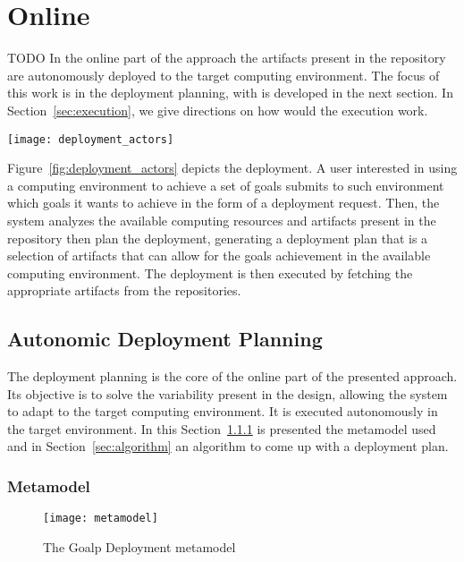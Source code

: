 \section{Online}
\label{sec:online}

TODO
In the online part of the approach the artifacts present in the repository are autonomously deployed to the target computing environment. The focus of this work is in the deployment planning, with is developed in the next section. In Section~\ref{sec:execution}, we give directions on how would the execution work.

\begin{figure*}[!htb]
  \centering
  \texttt{[image: deployment\_actors]}
  \caption{Goald Autonomic Deployment}
\label{fig:deployment_actors}
\end{figure*}

Figure~\ref{fig:deployment_actors} depicts the deployment. A user interested in using a computing environment to achieve a set of goals submits to such environment which goals it wants to achieve in the form of a deployment request. Then, the system analyzes the available computing resources and artifacts present in the repository then plan the deployment, generating a deployment plan that is a selection of artifacts that can allow for the goals achievement in the available computing environment. The deployment is then executed by fetching the appropriate artifacts from the repositories.

\subsection{Autonomic Deployment Planning}

\label{sec:planning}

The deployment planning is the core of the online part of the presented approach. Its objective is to solve the variability present in the design, allowing the system to adapt to the target computing environment. It is executed autonomously in the target environment. In this Section~\ref{sec:metamodel} is presented the metamodel used and in Section~\ref{sec:algorithm} an algorithm to come up with a deployment plan.

\subsubsection{Metamodel}
\label{sec:metamodel}

\begin{figure}[!htb]
  \centering
  \texttt{[image: metamodel]}
  \caption{The Goalp Deployment metamodel}
  \label{fig:metamodel}
\end{figure}

